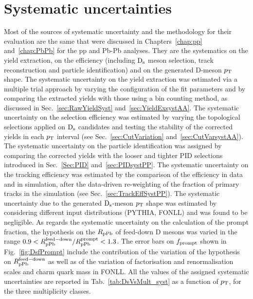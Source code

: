\section {Systematic uncertainties}
\label{sec:systpA}
Most of the sources of systematic uncertainty and the methodology for their evaluation are the same
that were discussed in Chapters~\ref{chap:pp} and~\ref{chap:PbPb} for
the pp and Pb-Pb analyses. They are the systematics on the yield extraction, 
on the efficiency (including ${\rm D_s}$ meson selection, track reconstruction and particle
identification) and on the generated D-meson $p_{\rm T}$ shape.
The systematic uncertainty on the yield extraction was estimated via a multiple
trial approach by varying the configuration of the fit parameters and by comparing the
extracted yields with those using a bin counting method, as discussed in Sec.~\ref{sec:RawYieldSyst} and~\ref{sec:YieldExsystAA}. 
The systematic uncertainty on the selection efficiency was estimated by 
varying the topological selections applied on ${\rm D_s}$ candidates and testing the 
stability of the corrected yields in each $p_{\rm T}$ interval (see Sec.~\ref{sec:CutVariation} and~\ref{sec:CutVarsystAA}). 
The systematic uncertainty on the particle
identification was assigned by comparing the corrected yields with the looser and tighter
PID selections introduced in Sec.~\ref{Sec:PID} and~\ref{sec:PIDsystPP}. 
The systematic uncertainty on the tracking efficiency was estimated by the comparison of the
efficiency in data and in simulation, after the data-driven re-weighting of the fraction of primary tracks in 
the simulation (see Sec.~\ref{sec:TrackEffSystPP}). 
The systematic uncertainty due to the generated ${\rm D_s}$-meson $p_{\rm T}$ shape was estimated by considering different input
distributions (PYTHIA, FONLL) and was found to be negligible. As regards the systematic uncertainty on the calculation of the prompt 
fraction, the hypothesis on the $R_{\rm pPb}$ of feed-down D mesons 
was varied in the range $0.9 <R_{\rm pPb}^{\rm feed-down}/R_{\rm pPb}^{\rm prompt} < 1.3$.
The error bars on $f_{\rm prompt}$ shown in Fig.~\ref{fig:DsfPrompt} include the
contribution of the variation of the hypothesis on $R_{\rm pPb}^{\rm feed-down}$ 
as well as of the variation of factorisation and renormalisation scales and charm quark mass in FONLL. 
All the values of the assigned systematic uncertainties are reported
in Tab.~\ref{tab:DsVsMult_syst} as a function of $p_{\rm T}$, for the 
three multiplicity classes. \\


